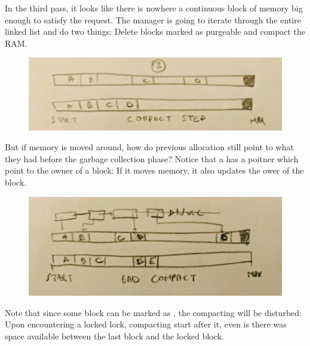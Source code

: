 \documentclass[book.tex]{subfiles}
\begin{document}
 \par
 In the third pass, it looks like there is nowhere a continuous block of memory big enough to satisfy the request. The manager is going to iterate through the entire linked list and do two things: Delete blocks marked as purgeable and compact the RAM.
  \par
\begin{figure}[H]
\centering
 \includegraphics[width=\textwidth]{imgs/mm_compact.png}
 \end{figure}
 \par
But if memory is moved around, how do previous allocation still point to what they had before the garbage collection phase? Notice that a  has a  poitner which point to the owner of a block: If it moves memory, it also updates the ower of the block.

   \par
\begin{figure}[H]
\centering
 \includegraphics[width=\textwidth]{imgs/mm_compact_bad_case.png}
 \end{figure}
 \par
 Note that since some block can be marked as , the compacting will be disturbed: Upon encountering a locked lock, compacting start after it, even is there was space available between the last block and the locked block.
\end{document}

